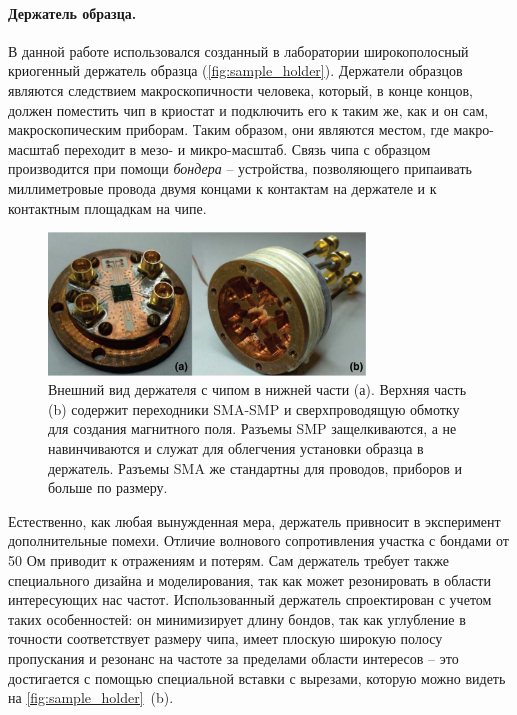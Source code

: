 \documentclass[12pt, twoside]{report}
\numberwithin{equation}{section}
\numberwithin{figure}{section}
\begin{document}
\paragraph{Держатель образца.}

 В данной работе использовался созданный в лаборатории широкополосный криогенный держатель образца\cite{averkin2014} (\autoref{fig:sample_holder}). Держатели образцов являются следствием макроскопичности человека, который, в конце концов, должен поместить чип в криостат и подключить его к таким же, как и он сам, макроскопическим приборам. Таким образом, они являются местом, где макро-масштаб переходит в мезо- и микро-масштаб. Связь чипа с образцом производится при помощи \textit{бондера} -- устройства, позволяющего припаивать миллиметровые провода двумя концами к контактам на держателе и к контактным площадкам на чипе. 
 
\begin{figure}[h]
\begingroup
\captionsetup{width = 0.9\textwidth, justification=normal}
\centering
\includegraphics[width=0.75\textwidth]{Pictures/sample_holder}
\caption{Внешний вид держателя\cite{averkin2014} с чипом в нижней части (а). Верхняя часть (b) содержит переходники SMA-SMP и сверхпроводящую обмотку для создания магнитного поля. Разъемы SMP защелкиваются, а не навинчиваются и служат для облегчения установки образца в держатель. Разъемы SMA же стандартны для проводов, приборов и больше по размеру.}
\label{fig:sample_holder}
\endgroup
\end{figure}

Естественно, как любая вынужденная мера, держатель привносит в эксперимент дополнительные помехи. Отличие волнового сопротивления участка с бондами от 50 Ом приводит к отражениям и потерям. Сам держатель требует также специального дизайна и моделирования, так как может резонировать в области интересующих нас частот. Использованный держатель спроектирован с учетом таких особенностей: он минимизирует длину бондов, так как углубление в точности соответствует размеру чипа, имеет плоскую широкую полосу пропускания и резонанс на частоте за пределами области интересов -- это достигается с помощью специальной вставки с вырезами, которую можно видеть на \autoref{fig:sample_holder}~(b).
\end{document}
